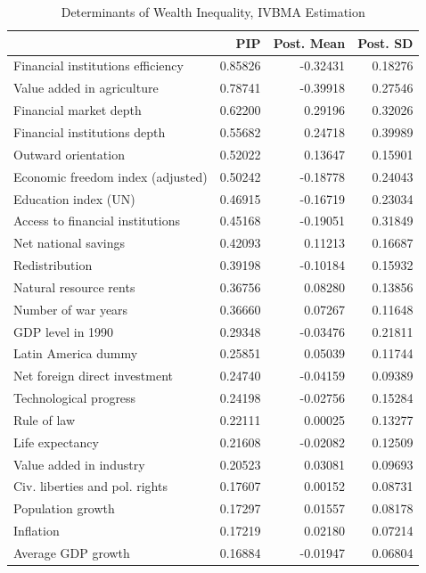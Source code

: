 \documentclass[a4paper,11pt]{article}
\begin{document}
\begin{table}[!ht]
	\footnotesize
	\centering
	\caption{Determinants of Wealth Inequality, IVBMA Estimation}
	\label{table:res_endo}
	\begin{threeparttable}
	\begin{tabular}{lrrr}
		\toprule
		& PIP & Post. Mean & Post. SD\\ 
		\midrule
		Financial institutions efficiency & 0.85826 & -0.32431 & 0.18276 \\ 
		Value added in agriculture & 0.78741 & -0.39918 & 0.27546 \\ 
		Financial market depth & 0.62200 & 0.29196 & 0.32026 \\ 
		Financial institutions depth & 0.55682 & 0.24718 & 0.39989 \\ 
		Outward orientation & 0.52022 & 0.13647 & 0.15901 \\ 
		Economic freedom index (adjusted) & 0.50242 & -0.18778 & 0.24043 \\ 
		Education index (UN) & 0.46915 & -0.16719 & 0.23034 \\ 
		Access to financial institutions & 0.45168 & -0.19051 & 0.31849 \\ 
		Net national savings & 0.42093 & 0.11213 & 0.16687 \\ 
		Redistribution & 0.39198 & -0.10184 & 0.15932 \\ 
		Natural resource rents & 0.36756 & 0.08280 & 0.13856 \\ 
		Number of war years & 0.36660 & 0.07267 & 0.11648 \\ 
		GDP level in 1990 & 0.29348 & -0.03476 & 0.21811 \\ 
		Latin America dummy & 0.25851 & 0.05039 & 0.11744 \\ 
		Net foreign direct investment & 0.24740 & -0.04159 & 0.09389 \\ 
		Technological progress & 0.24198 & -0.02756 & 0.15284 \\ 
		Rule of law & 0.22111 & 0.00025 & 0.13277 \\ 
		Life expectancy & 0.21608 & -0.02082 & 0.12509 \\ 
		Value added in industry & 0.20523 & 0.03081 & 0.09693 \\ 
		Civ. liberties and pol. rights & 0.17607 & 0.00152 & 0.08731 \\ 
		Population growth & 0.17297 & 0.01557 & 0.08178 \\ 
		Inflation & 0.17219 & 0.02180 & 0.07214 \\ 
		Average GDP growth & 0.16884 & -0.01947 & 0.06804 \\ 

\end{tabular}
\end{threeparttable}
\end{table}
\end{document}
